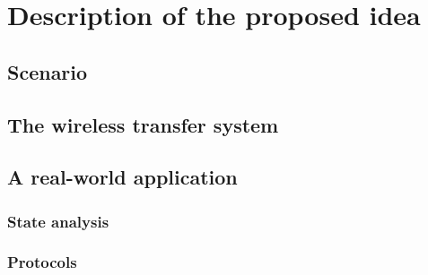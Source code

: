 \documentclass[a4paper, 10pt]{article}
\begin{document}


\section{Description of the proposed idea}
\label{sec:idea}


\subsection{Scenario}
\label{sec:scenario}


\subsection{The wireless transfer system}
\label{sec:realize}


\subsection{A real-world application}


\subsubsection{State analysis}
\label{sec:state}


\subsubsection{Protocols}
\label{sec:proto}

\end{document}
